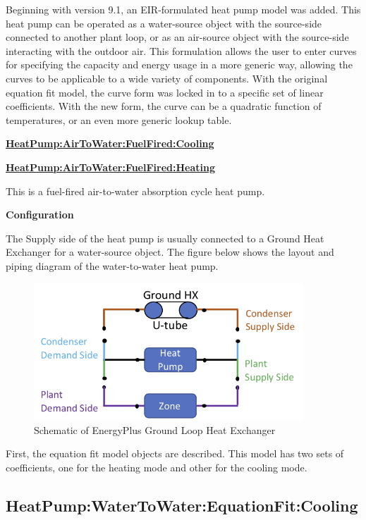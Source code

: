 Beginning with version 9.1, an EIR-formulated heat pump model was added. This heat pump can be operated as a water-source object with the source-side connected to another plant loop, or as an air-source object with the source-side interacting with the outdoor air. This formulation allows the user to enter curves for specifying the capacity and energy usage in a more generic way, allowing the curves to be applicable to a wide variety of components. With the original equation fit model, the curve form was locked in to a specific set of linear coefficients. With the new form, the curve can be a quadratic function of temperatures, or an even more generic lookup table.

\textbf{\hyperref[plhp_fuelfired]{HeatPump:AirToWater:FuelFired:Cooling}}

\textbf{\hyperref[plhp_fuelfired]{HeatPump:AirToWater:FuelFired:Heating}}

This is a fuel-fired air-to-water absorption cycle heat pump.


\textbf{Configuration}

The Supply side of the heat pump is usually connected to a Ground Heat Exchanger for a water-source object. The figure below shows the layout and piping diagram of the water-to-water heat pump.

\begin{figure}[hbtp] %
    \centering
    \includegraphics[width=0.9\textwidth, height=0.9\textheight, keepaspectratio=true]{media/image184.png}
    \caption{Schematic of EnergyPlus Ground Loop Heat Exchanger \protect \label{fig:schematic-of-energyplus-ground-loop-heat-001}}
\end{figure}

First, the equation fit model objects are described. This model has two sets of coefficients, one for the heating mode and other for the cooling mode.

\subsection{HeatPump:WaterToWater:EquationFit:Cooling}\label{heatpumpwatertowaterequationfitcooling}

